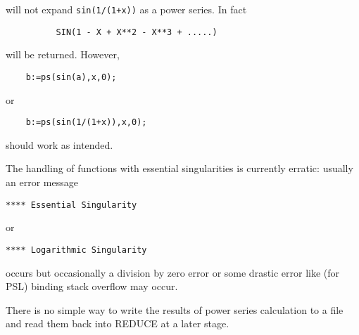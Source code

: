 will not expand {\tt sin(1/(1+x))} as a power series. In fact

\begin{verbatim}
          SIN(1 - X + X**2 - X**3 + .....)
\end{verbatim}

will be returned. However,

\begin{verbatim} 
    b:=ps(sin(a),x,0);
\end{verbatim}

or

\begin{verbatim} 
    b:=ps(sin(1/(1+x)),x,0);
\end{verbatim}

should work as intended.

The handling of functions with essential singularities is currently
erratic: usually an error message

\hspace*{2em} {\tt ***** Essential Singularity}

or

\hspace*{2em} {\tt ***** Logarithmic Singularity}

occurs but occasionally a division by
zero error or some drastic error like (for PSL) binding stack
overflow may occur.
 
There is no simple way to write the results of power series
calculation to a file and read them back into REDUCE at a later
stage.


